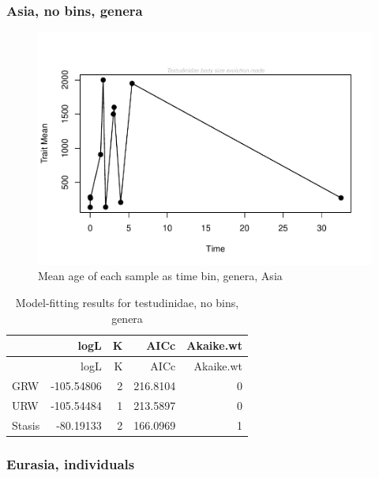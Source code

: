 \documentclass[]{article}
\begin{document}
\newpage 

\subsubsection{Asia, no bins, genera}\label{asia-no-bins-genera}

\begin{figure}[htbp]
\centering
\includegraphics{MA_JJ_files/figure-latex/paleoTS with different time bins, no bins, genera, Asia-1.pdf}
\caption{Mean age of each sample as time bin, genera, Asia}
\end{figure}

\begin{longtable}[]{@{}lrrrr@{}}
\caption{Model-fitting results for testudinidae, no bins,
genera}\tabularnewline
\toprule
& logL & K & AICc & Akaike.wt\tabularnewline
\midrule
\endfirsthead
\toprule
& logL & K & AICc & Akaike.wt\tabularnewline
\midrule
\endhead
GRW & -105.54806 & 2 & 216.8104 & 0\tabularnewline
URW & -105.54484 & 1 & 213.5897 & 0\tabularnewline
Stasis & -80.19133 & 2 & 166.0969 & 1\tabularnewline
\bottomrule
\end{longtable}

\newpage

\subsubsection{Eurasia, individuals}\label{eurasia-individuals}
\end{document}
